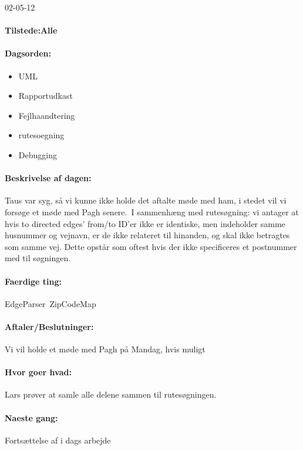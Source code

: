 \documentclass[a4paper,10pt,titlepage]{article}
\begin{document}
\begin{center}
		02-05-12
		\end{center}
		
		\paragraph{Tilstede:Alle}
		\paragraph{Dagsorden:}
		\begin{itemize}
					\item UML
					\item Rapportudkast
					\item Fejlhaandtering
					\item rutesoegning
					\item Debugging
		\end{itemize}
		
		\paragraph{Beskrivelse af dagen:}
		Taus var syg, så vi kunne ikke holde det aftalte møde med ham, i stedet vil vi forsøge et møde med Pagh senere.\
		I sammenhæng med rutesøgning: vi antager at hvis to directed edges’ from/to ID’er ikke er identiske, men indeholder samme husnummer og vejnavn, er de ikke relateret til hinanden, og skal ikke betragtes som samme vej. Dette opstår som oftest hvis der ikke specificeres et postnummer med til søgningen.
		\paragraph{Faerdige ting:}
		EdgeParser\
		ZipCodeMap
		\paragraph{Aftaler/Beslutninger:}
		Vi vil holde et møde med Pagh på Mandag, hvis muligt
		\paragraph{Hvor goer hvad:}
		Lars prøver at samle alle delene sammen til rutesøgningen.
		\paragraph{Naeste gang:}
Fortsættelse af i dags arbejde\mbox{}\\
\end{document}
